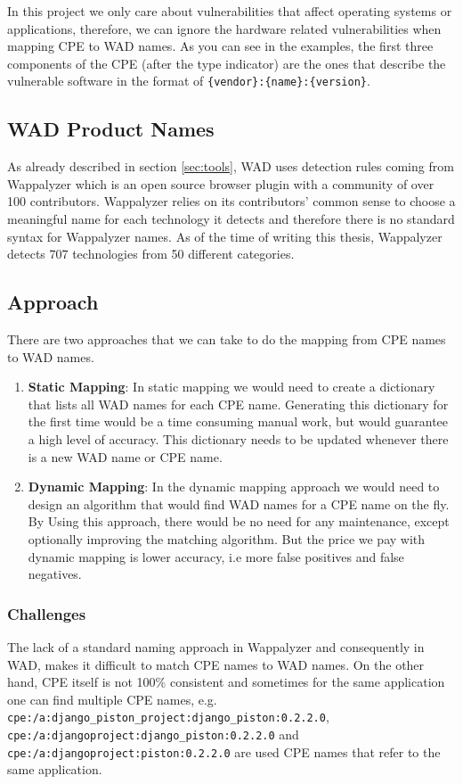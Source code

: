 In this project we only care about vulnerabilities that affect operating systems or applications, therefore, we can ignore the hardware related vulnerabilities when mapping CPE to WAD names. As you can see in the examples, the first three components of the CPE (after the type indicator) are the ones that describe the vulnerable software in the format of \texttt{\{vendor\}:\{name\}:\{version\}}.
 

\subsection{WAD Product Names}
As already described in section \ref{sec:tools}, WAD uses detection rules coming from Wappalyzer which is an open source browser plugin with a community of over 100 contributors. Wappalyzer relies on its contributors' common sense to choose a meaningful name for each technology it detects and therefore there is no standard syntax for Wappalyzer names. As of the time of writing this thesis, Wappalyzer detects 707 technologies from 50 different categories.


\subsection{Approach}

There are two approaches that we can take to do the mapping from CPE names to WAD names.
\begin{enumerate}
\item \textbf{Static Mapping}: In static mapping we would need to create a dictionary that lists all WAD names for each CPE name. Generating this dictionary for the first time would be a time consuming manual work, but would guarantee a high level of accuracy. This dictionary needs to be updated whenever there is a new WAD name or CPE name. 
\item \textbf{Dynamic Mapping}: In the dynamic mapping approach we would need to design an algorithm that would find WAD names for a CPE name on the fly. By Using this approach, there would be no need for any maintenance, except optionally improving the matching algorithm. But the price we pay with dynamic mapping is lower accuracy, i.e more false positives and false negatives.  
\end{enumerate} 



\subsubsection{Challenges}
The lack of a standard naming approach in Wappalyzer and consequently in WAD, makes it difficult to match CPE names to WAD names. On the other hand, CPE itself is not 100\% consistent and sometimes for the same application one can find multiple CPE names, e.g. \texttt{cpe:/a:django\_piston\_project:django\_piston:0.2.2.0}, \texttt{cpe:/a:djangoproject:django\_piston:0.2.2.0} and \texttt{cpe:/a:djangoproject:piston:0.2.2.0} are used CPE names that refer to the same application.
